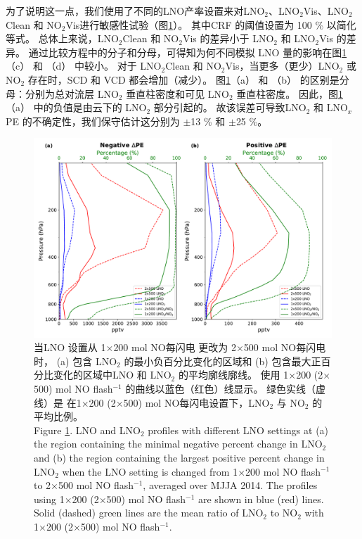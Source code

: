 为了说明这一点，我们使用了不同的LNO产率设置来对LNO$_2$、LNO$_2$Vis、LNO$_2$Clean 和 NO$_2$Vis进行敏感性试验（图\ref{fig:us_lno2_profile}）。
其中CRF 的阈值设置为 100 \% 以简化等式。
总体上来说，LNO$_2$Clean 和 NO$_2$Vis 的差异小于 LNO$_2$ 和 LNO$_2$Vis 的差异。
通过比较方程中的分子和分母，可得知为何不同模拟 LNO 量的影响在图\ref{fig:us_lno2_profile}（c） 和 （d） 中较小。
对于 LNO$_2$Clean 和 NO$_2$Vis，当更多（更少）LNO$_2$ 或 NO$_2$ 存在时，SCD 和 VCD 都会增加（减少）。
图\ref{fig:us_lno2_profile}（a） 和 （b） 的区别是分母：分别为总对流层 LNO$_2$ 垂直柱密度和可见 LNO$_2$ 垂直柱密度。
因此，图\ref{fig:us_lno2_profile}（a） 中的负值是由云下的 LNO$_2$ 部分引起的。
故该误差可导致LNO$_2$ 和 LNO$_x$ PE 的不确定性，我们保守估计这分别为 $\pm$13 \% 和 $\pm$25 \%。

\begin{figure}[t]
\centering
\includegraphics[width=13cm]{./figures/us_lno2_profile.pdf}
\caption{当LNO 设置从 1$\times$200 mol NO每闪电 更改为 2$\times$500 mol NO每闪电 时，
(a) 包含 LNO$_\textrm{2}$ 的最小负百分比变化的区域和 (b) 包含最大正百分比变化的区域中LNO 和 LNO$_\textrm{2}$ 的平均廓线廓线。
使用 1$\times$200 (2$\times$500) mol NO flash$^{-1}$ 的曲线以蓝色（红色）线显示。
绿色实线（虚线）是 在1$\times$200 (2$\times$500) mol NO每闪电设置下，LNO$_\textrm{2}$ 与 NO$_\textrm{2}$ 的平均比例。\\
Figure \ref{fig:us_lno2_profile}. LNO and LNO$_\textrm{2}$ profiles with different LNO settings at (a) the region containing the minimal negative percent change in LNO$_\textrm{2}$ and (b) the region containing the largest positive percent change in LNO$_\textrm{2}$ when the LNO setting is changed from 1$\times$200 mol NO flash$^{-1}$ to 2$\times$500 mol NO flash$^{-1}$, averaged over MJJA 2014.
The profiles using 1$\times$200 (2$\times$500) mol NO flash$^{-1}$ are shown in blue (red) lines.
Solid (dashed) green lines are the mean ratio of LNO$_\textrm{2}$ to NO$_\textrm{2}$ with 1$\times$200 (2$\times$500) mol NO flash$^{-1}$.}
\label{fig:us_lno2_profile}
\end{figure}


